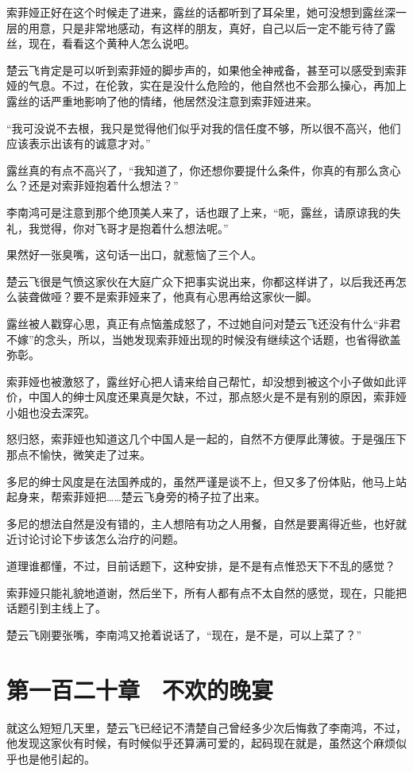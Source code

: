 索菲娅正好在这个时候走了进来，露丝的话都听到了耳朵里，她可没想到露丝深一层的用意，只是非常地感动，有这样的朋友，真好，自己以后一定不能亏待了露丝，现在，看看这个黄种人怎么说吧。

楚云飞肯定是可以听到索菲娅的脚步声的，如果他全神戒备，甚至可以感受到索菲娅的气息。不过，在伦敦，实在是没什么危险的，他自然也不会那么操心，再加上露丝的话严重地影响了他的情绪，他居然没注意到索菲娅进来。

“我可没说不去根，我只是觉得他们似乎对我的信任度不够，所以很不高兴，他们应该表示出该有的诚意才对。”

露丝真的有点不高兴了，“我知道了，你还想你要提什么条件，你真的有那么贪心么？还是对索菲娅抱着什么想法？”

李南鸿可是注意到那个绝顶美人来了，话也跟了上来，“呃，露丝，请原谅我的失礼，我觉得，你对飞哥才是抱着什么想法呢。”

果然好一张臭嘴，这句话一出口，就惹恼了三个人。

楚云飞很是气愤这家伙在大庭广众下把事实说出来，你都这样讲了，以后我还再怎么装聋做哑？要不是索菲娅来了，他真有心思再给这家伙一脚。

露丝被人戳穿心思，真正有点恼羞成怒了，不过她自问对楚云飞还没有什么“非君不嫁”的念头，所以，当她发现索菲娅出现的时候没有继续这个话题，也省得欲盖弥彰。

索菲娅也被激怒了，露丝好心把人请来给自己帮忙，却没想到被这个小子做如此评价，中国人的绅士风度还果真是欠缺，不过，那点怒火是不是有别的原因，索菲娅小姐也没去深究。

怒归怒，索菲娅也知道这几个中国人是一起的，自然不方便厚此薄彼。于是强压下那点不愉快，微笑走了过来。

多尼的绅士风度是在法国养成的，虽然严谨是谈不上，但又多了份体贴，他马上站起身来，帮索菲娅把……楚云飞身旁的椅子拉了出来。

多尼的想法自然是没有错的，主人想陪有功之人用餐，自然是要离得近些，也好就近讨论讨论下步该怎么治疗的问题。

道理谁都懂，不过，目前话题下，这种安排，是不是有点惟恐天下不乱的感觉？

索菲娅只能礼貌地道谢，然后坐下，所有人都有点不太自然的感觉，现在，只能把话题引到主线上了。

楚云飞刚要张嘴，李南鸿又抢着说话了，“现在，是不是，可以上菜了？”

\section{第一百二十章　不欢的晚宴}

就这么短短几天里，楚云飞已经记不清楚自己曾经多少次后悔救了李南鸿，不过，他发现这家伙有时候，有时候似乎还算满可爱的，起码现在就是，虽然这个麻烦似乎也是他引起的。

